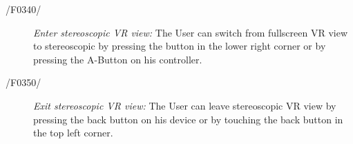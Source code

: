 \begin{description}
  \item[/F0340/]
    \textit{Enter stereoscopic VR view:} The User can switch from fullscreen VR view to stereoscopic by pressing the button in the lower right corner or by pressing the A-Button on his controller.
\end{description}

\begin{description}
  \item[/F0350/]
    \textit{Exit stereoscopic VR view:} The User can leave stereoscopic VR view by pressing the back button on his device or by touching the back button in the top left corner.
\end{description}
